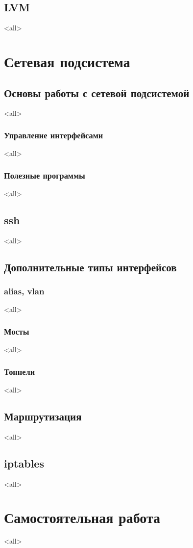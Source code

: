 \section{LVM}
\mode<all>{}

\chapter{Сетевая подсистема}

\section{Основы работы с сетевой подсистемой}

\mode<all>{}

\subsection{Управление интерфейсами}
\mode<all>{}

\subsection{Полезные программы}
\mode<all>{}

\section{ssh}
\mode<all>{}


\section{Дополнительные типы интерфейсов}

\subsection{alias, vlan}
\mode<all>{}
\subsection{Мосты}
\mode<all>{}
\subsection{Тоннели}
\mode<all>{}

\section{Маршрутизация}
\mode<all>{}

\section{iptables}
\mode<all>{}

\chapter{Самостоятельная работа}
\mode<all>{}
